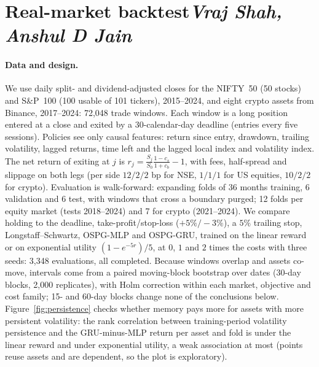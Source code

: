 \documentclass[11pt,a4paper]{article}
\newcommand{\by}[1]{\hfill{\normalfont\normalsize\itshape #1}}
\begin{document}
\begin{table}[ht]
\centering\scriptsize
\caption{Left: fBm stopping, mean test reward. Right: American put under rough Bergomi
($T=1$, $\eta=1.9$, $\rho=-0.9$, $\xi_0=0.09$, $r=0.05$, $S_0=K=100$), mean discounted payoff;
standard errors $0.31$--$0.37$.}
\label{tab:memory}
\begin{minipage}{.49\linewidth}\centering\end{minipage}%
\begin{minipage}{.49\linewidth}\centering\end{minipage}
\end{table}

\section[Real-market backtest]{Real-market backtest\by{Vraj Shah, Anshul D Jain}}
\label{sec:backtest}
\paragraph{Data and design.} We use daily split- and dividend-adjusted closes for the NIFTY~50
(50 stocks) and S\&P~100 (100 usable of 101 tickers), 2015--2024, and eight crypto assets from
Binance, 2017--2024: 72{,}048 trade windows. Each window is a long position entered at a close
and exited by a 30-calendar-day deadline (entries every five sessions). Policies see only causal
features: return since entry, drawdown, trailing volatility, lagged returns, time left and the
lagged local index and volatility index. The net return of exiting at $j$ is
$r_j=\frac{S_j}{S_0}\frac{1-c_s}{1+c_b}-1$, with fees, half-spread and slippage on both legs
(per side $12/2/2$ bp for NSE, $1/1/1$ for US equities, $10/2/2$ for crypto). Evaluation is
walk-forward: expanding folds of 36 months training, 6 validation and 6 test, with windows that
cross a boundary purged; 12 folds per equity market (tests 2018--2024) and 7 for crypto
(2021--2024). We compare holding to the deadline, take-profit/stop-loss ($+5\%/-3\%$), a $5\%$
trailing stop, Longstaff--Schwartz, OSPG-MLP and OSPG-GRU, trained on the linear reward or on
exponential utility $(1-e^{-5r})/5$, at $0$, $1$ and $2$ times the costs with three seeds: 3{,}348
evaluations, all completed. Because windows overlap and assets co-move, intervals come from a
paired moving-block bootstrap over dates (30-day blocks, 2{,}000 replicates), with Holm correction
within each market, objective and cost family; 15- and 60-day blocks change none of the
conclusions below. Figure~\ref{fig:persistence} checks whether memory pays more for assets with
more persistent volatility: the rank correlation between training-period volatility persistence
and the GRU-minus-MLP return per asset and fold is \perslinear{} under the linear reward and
\persexponential{} under exponential utility, a weak association at most (points reuse assets
and are dependent, so the plot is exploratory).
\end{document}
